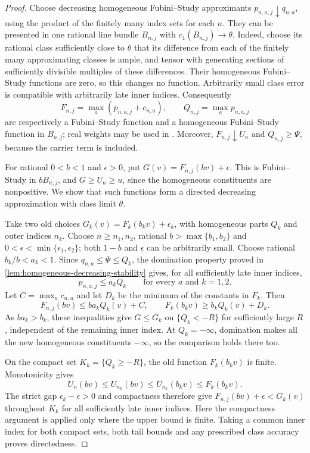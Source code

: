 \documentclass[11pt,a4paper]{article}
\begin{document}
\begin{proof}
Choose decreasing homogeneous Fubini--Study approximants $p_{n,a,j}\downarrow q_{n,a}$, using the product of the finitely many index sets for each $n$. They can be presented in one rational line bundle $B_{n,j}$ with $c_1(B_{n,j})\to\theta$. Indeed, choose its rational class sufficiently close to $\theta$ that its difference from each of the finitely many approximating classes is ample, and tensor with generating sections of sufficiently divisible multiples of these differences. Their homogeneous Fubini--Study functions are zero, so this changes no function. Arbitrarily small class error is compatible with arbitrarily late inner indices. Consequently
\[
 F_{n,j}=\max_a(p_{n,a,j}+c_{n,a}),\qquad
 Q_{n,j}=\max_a p_{n,a,j}
\]
are respectively a Fubini--Study function and a homogeneous Fubini--Study function in $B_{n,j}$; real weights may be used in \cite[Definition~4.1]{BJ22}. Moreover, $F_{n,j}\downarrow U_n$ and $Q_{n,j}\ge\Psi$, because the carrier term is included.

For rational $0<b<1$ and $\epsilon>0$, put $G(v)=F_{n,j}(bv)+\epsilon$. This is Fubini--Study in $bB_{n,j}$, and $G\ge U_n\ge u$, since the homogeneous constituents are nonpositive. We show that such functions form a directed decreasing approximation with class limit $\theta$.

Take two old choices $G_k(v)=F_k(b_kv)+\epsilon_k$, with homogeneous parts $Q_k$ and outer indices $n_k$. Choose $n\ge n_1,n_2$, rational $b>\max\{b_1,b_2\}$ and $0<\epsilon<\min\{\epsilon_1,\epsilon_2\}$; both $1-b$ and $\epsilon$ can be arbitrarily small. Choose rational $b_k/b<a_k<1$. Since $q_{n,a}\le\Psi\le Q_k$, the domination property proved in \cref{lem:homogeneous-decreasing-stability} gives, for all sufficiently late inner indices,
\[
 p_{n,a,j}\le a_kQ_k\qquad\text{for every }a\text{ and }k=1,2.
\]
Let $C=\max_a c_{n,a}$ and let $D_k$ be the minimum of the constants in $F_k$. Then
\[
 F_{n,j}(bv)\le ba_kQ_k(v)+C,
 \qquad F_k(b_kv)\ge b_kQ_k(v)+D_k.
\]
As $ba_k>b_k$, these inequalities give $G\le G_k$ on $\{Q_k<-R\}$ for sufficiently large $R$, independent of the remaining inner index. At $Q_k=-\infty$, domination makes all the new homogeneous constituents $-\infty$, so the comparison holds there too.

On the compact set $K_k=\{Q_k\ge-R\}$, the old function $F_k(b_kv)$ is finite. Monotonicity gives
\[
 U_n(bv)\le U_{n_k}(bv)\le U_{n_k}(b_kv)\le F_k(b_kv).
\]
The strict gap $\epsilon_k-\epsilon>0$ and compactness therefore give $F_{n,j}(bv)+\epsilon<G_k(v)$ throughout $K_k$ for all sufficiently late inner indices. Here the compactness argument is applied only where the upper bound is finite. Taking a common inner index for both compact sets, both tail bounds and any prescribed class accuracy proves directedness.


\end{proof}
\end{document}
